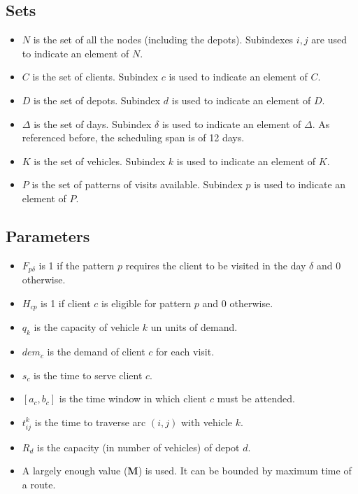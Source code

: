 \documentclass[preprint,review,12pt]{elsarticle}
\begin{document}
\subsection{Sets}
\begin{itemize}
	\item $N$ is the set of all the nodes  (including the depots). Subindexes $i,j$ are used to indicate an element of $N$.
	\item $C$ is the set of clients. Subindex $c$ is used to indicate an element of $C$.
	\item $D$ is the set of depots. Subindex $d$ is used to indicate an element of $D$.
	\item $\Delta$ is the set of days. Subindex $\delta$ is used to indicate an element of $\Delta$. As referenced before, the scheduling span is of 12 days.
	\item $K$ is the set of vehicles. Subindex $k$ is used to indicate an element of $K$.
	\item $P$ is the set of patterns of visits available. Subindex $p$ is used to indicate an element of $P$.
\end{itemize}
 
\subsection{Parameters}
\begin{itemize}
	\item $F_{p\delta}$ is 1 if the pattern $p$ requires the client to be visited in the day $\delta$ and 0 otherwise.
	\item $H_{cp}$ is 1 if client $c$ is eligible for pattern $p$ and 0 otherwise.
	\item $q_k$ is the capacity of vehicle $k$ un units of demand.
	\item $dem_c$ is the demand of client $c$ for each visit.
	\item $s_c$ is the time to serve client $c$.
	\item $[a_c,b_c]$ is the time window in which client $c$ must be attended.
	\item $t_{ij}^k$ is the time to traverse arc $(i,j)$ with vehicle $k$.
	\item $R_d$ is the capacity (in number of vehicles) of depot $d$.
	\item A largely enough value (\textbf{M}) is used. It can be bounded by maximum time of a route.
\end{itemize}
\end{document}
